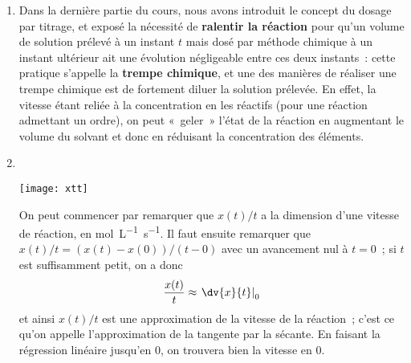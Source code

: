\documentclass[a4paper, 12pt, final, garamond]{book}
\begin{document}
\begin{enumerate}
\begin{rrapp}{Outil}
            Une réaction $a{\rm A} + b{\rm B} = c{\rm C} + d{\rm D}$ a une loi
            de vitesse admettant un ordre si elle s'écrit
            \[v = k[{\rm A}]^{\alpha}[{\rm B}]^{\beta}\]
            avec $\alpha$ l'ordre partiel par rapport au réactif A et $\beta$
            l'ordre partiel par rapport au réactif B.
        \end{rrapp}
        \begin{rprop}{Résultat}
            Ici, les réactifs sont les ions fer III et les ions iodure, donc la
            vitesse s'écrirait donc
            \[
                \boxed{
                    v = k [\ce{Fe\plus{3}}]^a[\ce{I\moin{}}]^b
                }
            \]
        \end{rprop}
        \begin{rexem}{Application}
            On trouve l'unité de $k$ en étudiant celles des termes en jeu dans
            l'équation~:
            \[\si{mol.L^{-1}.s^{-1}} = [k]\times (\si{mol.L^{-1}})^{a+b}\]
            donc la dimension de $k$ est
            .
        \end{rexem}
    \item Dans la dernière partie du cours, nous avons introduit le concept du
        dosage par titrage, et exposé la nécessité de \textbf{ralentir la
        réaction} pour qu'un volume de solution prélevé à un instant $t$ mais
        dosé par méthode chimique à un instant ultérieur ait une évolution
        négligeable entre ces deux instants~: cette pratique s'appelle la
        \textbf{trempe chimique}, et une des manières de réaliser une trempe
        chimique est de fortement diluer la solution prélevée. En effet, la
        vitesse étant reliée à la concentration en les réactifs (pour une
        réaction admettant un ordre), on peut «~geler~» l'état de la réaction en
        augmentant le volume du solvant et donc en réduisant la concentration
        des éléments.
    \item~

        \begin{minipage}{0.45\linewidth}
            \begin{center}
                \texttt{[image: xtt]}
            \end{center}
        \end{minipage}
        \hfill
        \begin{minipage}{0.45\linewidth}
            On peut commencer par remarquer que $x(t)/t$ a la dimension d'une
            vitesse de réaction, en \si{mol.L^{-1}.s^{-1}}. Il faut ensuite
            remarquer que $x(t)/t = (x(t) - x(0))/(t-0)$ avec un avancement nul
            à $t=0$~; si $t$ est suffisamment petit, on a donc
            \[ \frac{x(t)}{t} \approx \left.\dv{x}{t}\right|_0\]
            et ainsi $x(t)/t$ est une approximation de la vitesse de la
            réaction~; c'est ce qu'on appelle l'approximation de la tangente par
            la sécante. En faisant la régression linéaire jusqu'en 0, on
            trouvera bien la vitesse en 0.
        \end{minipage}


\end{enumerate}
\end{document}
